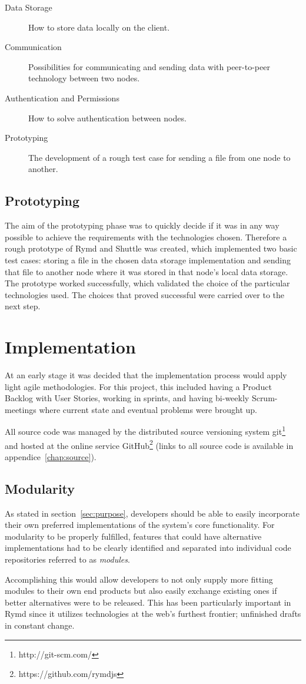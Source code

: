 \begin{description}
  \item[Data Storage] How to store data locally on the client.
  \item[Communication] Possibilities for communicating and sending data with peer-to-peer technology between two nodes.
  \item[Authentication and Permissions] How to solve authentication between nodes.
  \item[Prototyping] The development of a rough test case for sending a file from one node to another.
\end{description}

\subsection{Prototyping}

The aim of the prototyping phase was to quickly decide if it was in any way possible to achieve the requirements with the technologies chosen. Therefore a rough prototype of Rymd and Shuttle was created, which implemented two basic test cases: storing a file in the chosen data storage implementation and sending that file to another node where it was stored in that node's local data storage. The prototype worked successfully, which validated the choice of  the particular technologies used. The choices that proved successful were carried over to the next step.

\section{Implementation}

At an early stage it was decided that the implementation process would apply light agile methodologies. For this project, this included having a Product Backlog with User Stories, working in sprints, and having bi-weekly Scrum-meetings where current state and eventual problems were brought up.

All source code was managed by the distributed source versioning system git\footnote{http://git-scm.com/} and hosted at the online service GitHub\footnote{https://github.com/rymdjs} (links to all source code is available in appendice~\ref{chap:source}).

\subsection{Modularity}
\label{sec:modularity}

As stated in section~\ref{sec:purpose}, developers should be able to easily incorporate their own preferred implementations of the system's core functionality. For modularity to be properly fulfilled, features that could have alternative implementations had to be clearly identified and separated into individual code repositories referred to as \emph{modules}.

Accomplishing this would allow developers to not only supply more fitting modules to their own end products but also easily exchange existing ones if better alternatives were to be released. This has been particularly important in Rymd since it utilizes technologies at the web's furthest frontier; unfinished drafts in constant change.
